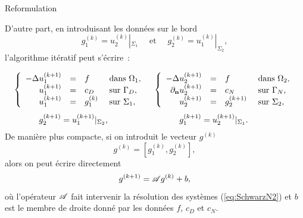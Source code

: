 \documentclass[
mode=present,    %
paper=a4paper,   %
orient=landscape,
display=slides,   %
size=10pt,
style=romain   %
]{powerdot}
\begin{document}
\begin{slide}[toc=Reformulation]{Reformulation}

D'autre part, en introduisant les données sur le bord
$$
g_{1}^{(k)} = u_{2}^{(k)}|_{\Sigma_{1}} \quad\text{ et } \quad g_{2}^{(k)} = u_{1}^{(k)}|_{\Sigma_{2}},
$$
l'algorithme itératif peut s'écrire~:

\begin{equation}\label{eq:SchwarzN2}
\begin{array}{l}
\displaystyle{
\left\{\begin{array}{r c l l}
-\Delta u_{1}^{(k+1)} &=& f &\text{ dans } \Omega_{1},\\
u_{1}^{(k+1)} &=& c_{D} & \text{ sur }\Gamma_{D},\\
u_{1}^{(k+1)} &=& g_{1}^{(k)} & \text{ sur }\Sigma_{1},\\
\end{array}\right.
}\\[0.8cm]
\qquad\quad g_{2}^{(k+1)} = u_{1}^{(k+1)}|_{\Sigma_{2}},
\end{array}
\begin{array}{l}
\displaystyle{
\left\{\begin{array}{r c l l}
-\Delta u_{2}^{(k+1)} &=& f &\text{ dans } \Omega_{2},\\
\partial_{\mathbf{n}}u_{2}^{(k+1)} &=& c_{N} & \text{ sur }\Gamma_{N},\\
u_{2}^{(k+1)} &=& g_{2}^{(k+1)} & \text{ sur }\Sigma_{2},\\
\end{array}\right.}\\[0.8cm]
\qquad\quad g_{1}^{(k+1)} = u_{2}^{(k+1)}|_{\Sigma_{1}}.
\end{array}
\end{equation}
De manière plus compacte, si on introduit le vecteur $g^{(k)}$ 
$$
g^{(k)}=[g_{1}^{(k)},g_{2}^{(k)}],
$$
alors on peut écrire directement
$$
g^{(k+1)} = {\mathscr A} g^{(k)} + b,
$$
où l'opérateur ${\mathscr A}$ fait intervenir la résolution des systèmes (\ref{eq:SchwarzN2}) et $b$ est le membre de droite donné par les données $f$, $c_{D}$ et $c_{N}$.

\end{slide}
\end{document}
